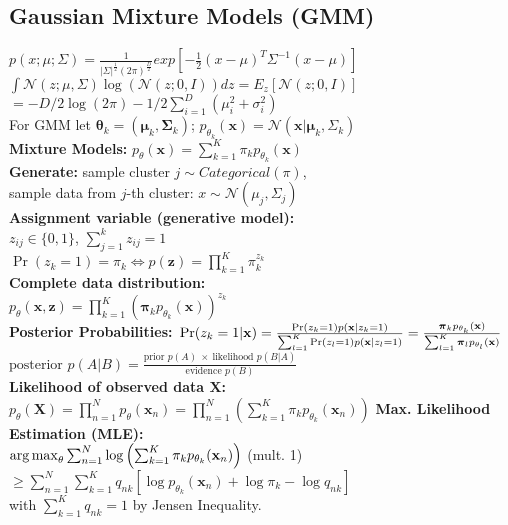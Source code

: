\subsection*{Gaussian Mixture Models (GMM)}
$p(x;\mu;\Sigma)=\frac{1}{|\Sigma|^{\frac{1}{2}}(2\pi)^{\frac{D}{2}}}\mathit{exp}[-\frac{1}{2}(x-\mu)^T \Sigma^{-1} (x-\mu)]$ \\
$\int \mathcal{N}(z;\mu, \Sigma) \log(\mathcal{N}(z;0,I)) dz = E_z[\mathcal{N}(z;0, I)]$\\
$=-D/2 \log(2\pi)-1/2 \sum_{i=1}^D(\mu_i^2 + \sigma_i^2)$ \\
For GMM let $\boldsymbol{\theta}_k = (\boldsymbol{\mu}_k, \boldsymbol{\Sigma}_k)$; $p_{\theta_k}(\mathbf{x}) = \mathcal{N}(\mathbf{x} | \boldsymbol{\mu}_k, \Sigma_k)$\\
\textbf{Mixture Models:} $p_\theta(\mathbf{x}) = \sum_{k=1}^K \pi_k p_{\theta_k}(\mathbf{x})$\\
\textbf{Generate:}
sample cluster $j \sim Categorical(\pi)$, \\
sample data from $j$-th cluster: $x \sim \mathcal{N}(\mu_j, \Sigma_j)$\\
\textbf{Assignment variable (generative model):} \\
$z_{ij} \in \{0, 1\}$, $\sum_{j=1}^k z_{ij} = 1$\\
$\operatorname{Pr}(z_k = 1) = \pi_k \Leftrightarrow p(\mathbf{z}) = \prod_{k=1}^K \pi_k^{z_k}$\\
\textbf{Complete data distribution:}\\
$p_\theta(\mathbf{x}, \mathbf{z}) = \prod_{k=1}^K \left( \boldsymbol{\pi}_k p_{\theta_k}(\mathbf{x})\right)^{z_k}$\\
\textbf{Posterior Probabilities:} $\\\operatorname{Pr}(z_k = 1 | \mathbf{x}) = \frac{\operatorname{Pr}(z_k = 1) p(\mathbf{x} | z_k = 1)}{\sum_{l=1}^K \operatorname{Pr}(z_l = 1) p(\mathbf{x} | z_l = 1)} = \frac{\boldsymbol{\pi}_k p_{\theta_k}(\mathbf{x})}{\sum_{l=1}^K \boldsymbol{\pi}_l p_{\theta_l}(\mathbf{x})}$\\
$\text{posterior } p(A|B)=\frac{\text{prior } p(A)\ \times \ \text{likelihood } p(B|A)}{\text{evidence } p(B)}$\\
\textbf{Likelihood of observed data $\mathbf{X}$:}\\
$p_\theta(\mathbf{X}) = \prod_{n=1}^N p_\theta(\mathbf{x}_n) = \prod_{n=1}^N \left(\sum_{k=1}^K \pi_k p_{\theta_k}(\mathbf{x}_n)\right)$
\textbf{Max. Likelihood Estimation (MLE):}\\
$\operatorname*{arg\,max}_\theta\sum_{n=1}^N \log \left( \sum_{k=1}^K \pi_k p_{\theta_k}(\mathbf{x}_n)\right)$ (mult. 1)\\
$\ge \sum_{n=1}^N \sum_{k=1}^K{q_{nk}[\log p_{\theta_k}(\mathbf{x}_n) + \log \pi_k - \log q_{nk}]}$\\
with $\sum_{k=1}^K{q_{nk}} = 1$ by Jensen Inequality.
